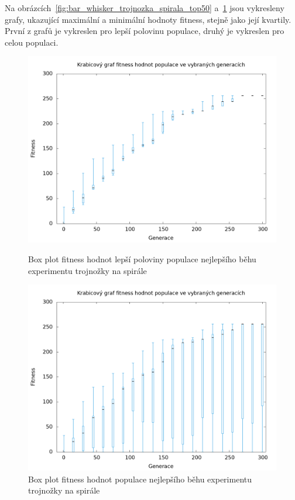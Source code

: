 Na obrázcích~\ref{fig:bar_whisker_trojnozka_spirala_top50} a~\ref{fig:bar_whisker_trojnozka_spirala} jsou vykresleny grafy, ukazující maximální a minimální hodnoty fitness, stejně jako její kvartily.
První z grafů je vykreslen pro lepší polovinu populace, druhý je vykreslen pro celou populaci.

\begin{figure}[h]
    \begin{minipage}[c]{0.48\linewidth}
        \includegraphics[width=\linewidth]{obrazky/bar_whisker_trojnozka_spirala_top50.png}
        \caption{Box plot fitness hodnot lepší poloviny populace nejlepšího běhu experimentu trojnožky na spirále}
        \label{fig:bar_whisker_trojnozka_spirala_top50}

    \end{minipage}
    \hfill
    \begin{minipage}[c]{0.48\linewidth}
        \includegraphics[width=\linewidth]{obrazky/bar_whisker_trojnozka_spirala.png}
        \caption{Box plot fitness hodnot populace nejlepšího běhu experimentu trojnožky na spirále}
        \label{fig:bar_whisker_trojnozka_spirala}

    \end{minipage}
\end{figure}


